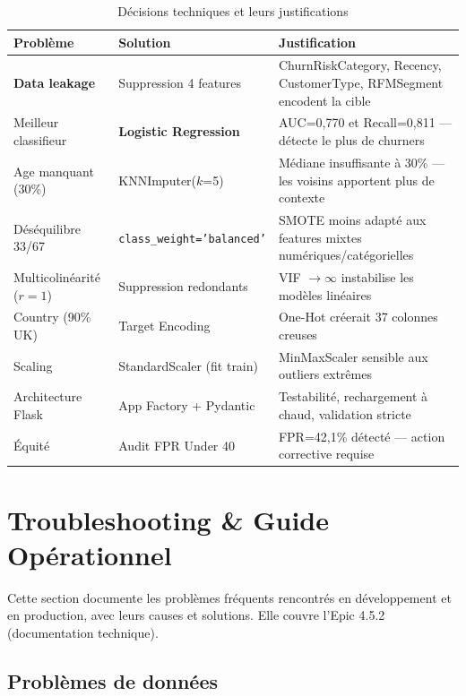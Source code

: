 \documentclass[11pt,a4paper]{article}
\begin{document}
\begin{table}[H]
\centering\small
\caption{Décisions techniques et leurs justifications}
\begin{tabular}{L{3.8cm} L{3.8cm} L{6cm}}
\toprule
{}
\textbf{Problème} & \textbf{Solution} & \textbf{Justification} \\
\midrule
{}
\textbf{Data leakage} & Suppression 4 features & ChurnRiskCategory, Recency, CustomerType, RFMSegment encodent la cible \\
Meilleur classifieur & \textbf{Logistic Regression} & AUC=0,770 et Recall=0,811 — détecte le plus de churners \\
Age manquant (30\%) & KNNImputer($k$=5) & Médiane insuffisante à 30\% — les voisins apportent plus de contexte \\
Déséquilibre 33/67 & \texttt{class\_weight='balanced'} & SMOTE moins adapté aux features mixtes numériques/catégorielles \\
Multicolinéarité ($r\!=\!1$) & Suppression redondants & VIF $\to \infty$ instabilise les modèles linéaires \\
Country (90\% UK) & Target Encoding & One-Hot créerait 37 colonnes creuses \\
Scaling & StandardScaler (fit train) & MinMaxScaler sensible aux outliers extrêmes \\
Architecture Flask & App Factory + Pydantic & Testabilité, rechargement à chaud, validation stricte \\
Équité & Audit FPR Under 40 & FPR=42,1\% détecté — action corrective requise \\
\bottomrule
\end{tabular}
\end{table}

\section{Troubleshooting \& Guide Opérationnel}

Cette section documente les problèmes fréquents rencontrés en développement et en production, avec leurs causes et solutions. Elle couvre l'Epic 4.5.2 (documentation technique).

\subsection{Problèmes de données}
\end{document}

